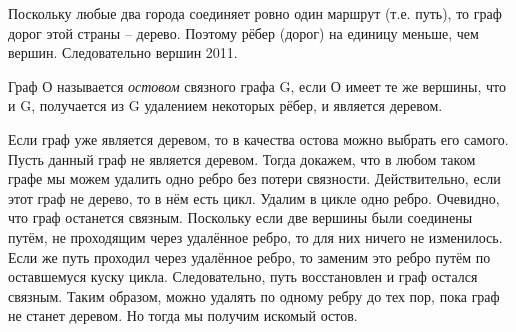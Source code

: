 \begin{prf}
    Поскольку любые два города соединяет ровно один маршрут (т.е. путь), то граф дорог этой страны – дерево. Поэтому рёбер (дорог) на единицу меньше, чем вершин. Следовательно вершин 2011.
\end{prf}

\begin{dfn}
    Граф О называется \textit{остовом} связного графа G, если О имеет те же вершины, что и G, получается из G удалением некоторых рёбер, и является деревом.
\end{dfn}


\begin{dok}
    Если граф уже является деревом, то в качества остова можно выбрать его самого. Пусть данный граф не является деревом. Тогда докажем, что в любом таком графе мы можем удалить одно ребро без потери связности. Действительно, если этот граф не дерево, то в нём есть цикл. Удалим в цикле одно ребро. Очевидно, что граф останется связным. Поскольку если две вершины были соединены путём, не проходящим через удалённое ребро, то для них ничего не изменилось. Если же путь проходил через удалённое ребро, то заменим это ребро путём по оставшемуся куску цикла. Следовательно, путь восстановлен и граф остался связным. Таким образом, можно удалять по одному ребру до тех пор, пока граф не станет деревом. Но тогда мы получим искомый остов.
\end{dok}

